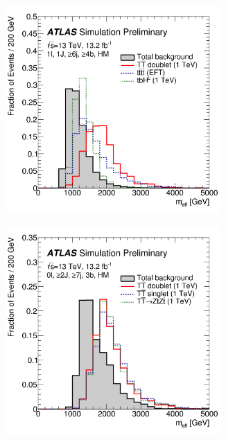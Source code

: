 \begin{figure}[h!]
\begin{subfigure}{0.5\textwidth}
  \centering
  \includegraphics[width=0.9\textwidth]{figures/VLQ/meff1l.png}
  \caption{}
  \label{}
\end{subfigure}
\begin{subfigure}{0.5\textwidth}
  \centering
  \includegraphics[width=0.9\textwidth]{figures/VLQ/meff0l.png}
  \caption{}
  \label{}
\end{subfigure}


\end{figure}
